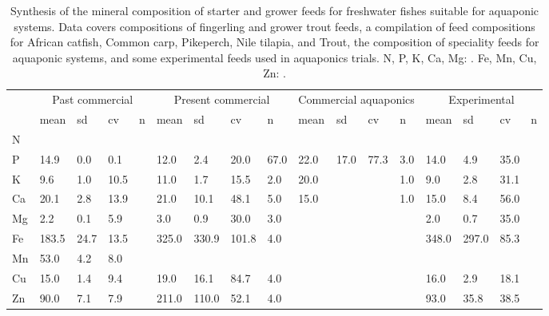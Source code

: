 \begin{sidewaystable}
\centering
  \begin{threeparttable}

  \caption{Synthesis of the mineral composition of starter and grower feeds for freshwater fishes suitable for aquaponic systems. Data covers compositions of fingerling and grower trout feeds, a compilation of feed compositions for African catfish, Common carp, Pikeperch, Nile tilapia, and Trout, the composition of speciality feeds for aquaponic systems, and some experimental feeds used in aquaponics trials. N, P, K, Ca, Mg: \si{\gkg}. Fe, Mn, Cu, Zn: \si{\mgkg}.}
  \label{tab:feedcomp}

    \begin{tabularx}{\textwidth}{XXXXXXXXXXXXXXXXX}

\toprule

& \multicolumn{4}{c}{Past commercial} %
& \multicolumn{4}{c}{Present commercial} %
& \multicolumn{4}{c}{Commercial aquaponics} %
& \multicolumn{4}{c}{Experimental} %
\\
  \cline{2-5}\cline{6-9}\cline{10-13}\cline{14-17}

& mean
& sd
& cv
& n
& mean
& sd
& cv
& n
& mean
& sd
& cv
& n
& mean
& sd
& cv
& n
\\

\midrule

N
& \tnote{‡}
&
&
&
&
&
&
&
&
&
&
&
&
&
&
&
\\ %
P
& 14.9
& 0.0
& 0.1
&
& 12.0
& 2.4
& 20.0
& 67.0
& 22.0
& 17.0
& 77.3
& 3.0
& 14.0
& 4.9
& 35.0
&
\\ %
K
& 9.6
& 1.0
& 10.5
&
& 11.0
& 1.7
& 15.5
& 2.0
& 20.0
& &
& 1.0
& 9.0
& 2.8
& 31.1
&
\\ %
Ca
& 20.1
& 2.8
& 13.9
&
& 21.0
& 10.1
& 48.1
& 5.0
& 15.0
&
&
& 1.0
& 15.0
& 8.4
& 56.0
&
\\ %
Mg\tnote{†}
& 2.2
& 0.1
& 5.9
&
& 3.0
& 0.9
& 30.0
& 3.0
&
&
&
&
& 2.0
& 0.7
& 35.0
&
\\ %
Fe\tnote{†}
& 183.5
& 24.7
& 13.5
&
& 325.0
& 330.9
& 101.8
& 4.0
&
&
&
&
& 348.0
& 297.0
& 85.3
&
\\ %
Mn\tnote{†}
& 53.0
& 4.2
& 8.0
&
&
&
&
&
&
&
&
&
&
&
&
&
\\ %
Cu\tnote{†}
& 15.0
& 1.4
& 9.4
&
& 19.0
& 16.1
& 84.7
& 4.0
&
&
&
&
& 16.0
& 2.9
& 18.1
&
\\ %
Zn\tnote{†}
& 90.0
& 7.1
& 7.9
&
& 211.0
& 110.0
& 52.1
& 4.0
&
&
&
&
& 93.0
& 35.8
& 38.5
&
\\ %


\end{tabularx}
\end{threeparttable}
\end{sidewaystable}
